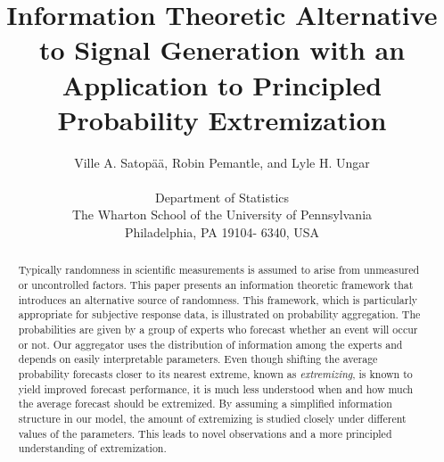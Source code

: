 \documentclass[11pt,twoside]{article}
\begin{document}
\title{Information Theoretic Alternative to Signal Generation with an Application to Principled Probability Extremization}
\author{
Ville A. Satop\"a\"a, Robin Pemantle, and Lyle H. Ungar\\
\\
 \small Department of Statistics\\
 \small The Wharton School of the University of Pennsylvania\\
 \small Philadelphia, PA 19104- 6340, USA\\ [-0.25in]} \date{}
\maketitle

\pagestyle{myheadings}
\thispagestyle{empty}

\begin{abstract}
Typically randomness in scientific measurements is assumed to arise from unmeasured or uncontrolled factors. This paper presents an information theoretic framework that introduces an alternative source of randomness. This framework, which is particularly appropriate for subjective response data, is illustrated on probability aggregation. The probabilities are given by a group of experts who forecast whether an event will occur or not. Our aggregator uses the distribution of information among the experts and depends on easily interpretable parameters. Even though shifting the average probability forecasts closer to its nearest extreme, known as \textit{extremizing}, is known to yield improved forecast performance, it is much less understood when and how much the average forecast should be extremized. By assuming a simplified information structure in our model, the amount of extremizing is studied closely under different values of  the parameters. This leads to novel observations and a more principled understanding of extremization.
\end{abstract}

\end{document}
